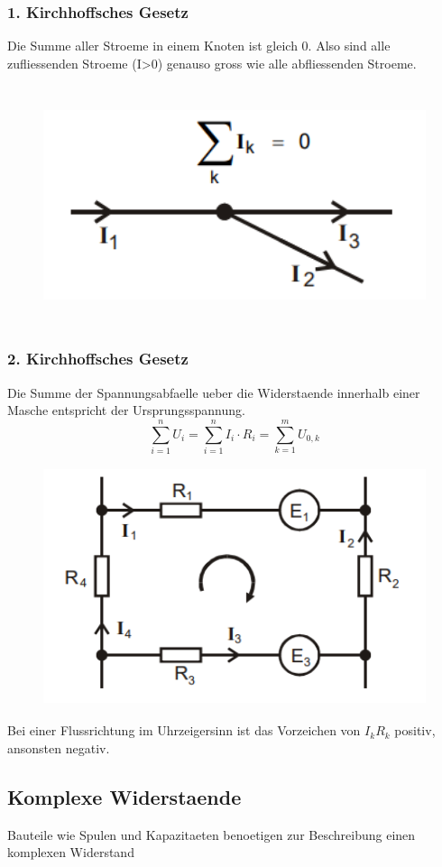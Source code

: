 \subsubsection{1. Kirchhoffsches Gesetz}
Die Summe aller Stroeme in einem Knoten ist gleich 0. Also sind alle zufliessenden Stroeme (I>0) genauso gross wie alle abfliessenden Stroeme. 
\begin{figure}[H]
    \centering
    \captionsetup{justification=centering}
    \includegraphics[height=7cm]{"Kirchhoff1_Brueckenschaltung.png"}
    \label{Fig:Kirchhoff1}
\end{figure}
\subsubsection{2. Kirchhoffsches Gesetz}
Die Summe der Spannungsabfaelle ueber die Widerstaende innerhalb einer Masche entspricht der Ursprungsspannung.
\begin{equation}
    \sum_{i=1}^n U_i=\sum_{i=1}^n I_i\cdot R_i=\sum_{k=1}^m U_{0,k}
\end{equation}
\begin{figure}[H]
    \centering
    \captionsetup{justification=centering}
    \includegraphics[height=7cm]{"Kirchhoff2_Brueckenschaltung.png"}
    \label{Fig:Kirchhoff2}
\end{figure}
Bei einer Flussrichtung im Uhrzeigersinn ist das Vorzeichen von $I_kR_k$ positiv, ansonsten negativ.
\subsection{Komplexe Widerstaende}
Bauteile wie Spulen und Kapazitaeten benoetigen zur Beschreibung einen komplexen Widerstand 